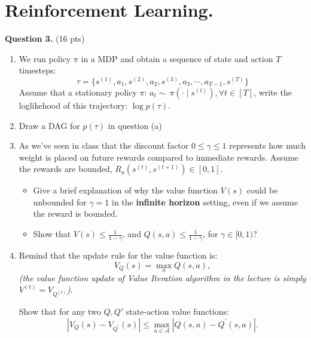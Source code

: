 \documentclass[11pt]{article}
\begin{document}
\section*{Reinforcement Learning.}
\textbf{Question 3.} (16 pts)
    \begin{enumerate}
        \item[(a)] We run policy $\pi$ in a MDP and obtain a sequence of state and action $T$ timesteps:
        \[\tau=\{s^{(1)}, a_1, s^{(2)}, a_2, s^{(3)}, a_3,\cdots, a_{T-1}, s^{(T)}\}\]
       Assume that a stationary policy $\pi$: $a_t \sim ~\pi(\cdot \mid s^{(t)}), \forall t\in[T]$, write the loglikehood of this trajectory:  $\log p(\tau)$.
        
    \begin{answertext}{3cm}{}
    \end{answertext}

    \item [(b)] Draw a DAG for $p(\tau)$ in question (a)
    
    \begin{answertext}{3cm}{}
    \end{answertext}

    \item [(c)] As we've seen in class that the discount factor $0\leq \gamma \leq 1$ represents how much weight is placed on future rewards compared to immediate rewards. Assume the rewards are bounded, $R_a(s^{(t)}, s^{(t+1)})\in [0,1]$.
   \begin{itemize}
       \item 
    Give a brief explanation of why the value function $V(s)$ could be unbounded for $\gamma=1$ in the \textbf{infinite horizon} setting, even if we assume the reward is bounded. 
   \item  
    Show that $V(s)\leq \frac{1}{1-\gamma}$, and $Q(s,a)\leq \frac{1}{1-\gamma}$, for $\gamma \in [0,1)$?
   \end{itemize} 
    \begin{answertext}{4.5cm}{}
    \end{answertext}

    \pagebreak
    \item [(d)] Remind that the update rule for the value function is:
    $$V_Q(s)=\max_a Q(s,a),$$
\textit{(the value function update of Value Iteration algorithm in the lecture is simply $V^{(t)}=V_{Q^{(t)}}$)}.

    Show that for any two $Q, Q'$ state-action value functions:
   $$\left|V_Q(s)-V_{Q^{\prime}}(s)\right| \leq \max _{a \in \mathcal{A}}\left|Q(s, a)-Q^{\prime}(s, a)\right| .$$ 
    \begin{answertext}{2cm}{}
    \end{answertext}
    \end{enumerate}

\pagebreak
\end{document}
